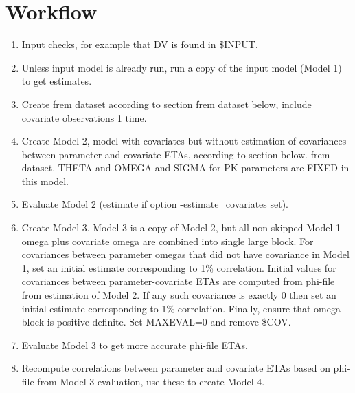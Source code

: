 \section{Workflow}
\begin{enumerate}
\item Input checks, for example that DV is found in \$INPUT.
\item Unless input model is already run,
run a copy of the input model (Model 1) to get estimates.
\item Create frem dataset according to section frem dataset below, include covariate observations 1 time.
\item Create Model 2, model with covariates but without
estimation of covariances between parameter and covariate ETAs,
according to section below. frem dataset.
THETA and OMEGA and SIGMA for PK parameters are FIXED in this model.
\item Evaluate Model 2 (estimate if option -estimate\_covariates set).
\item Create Model 3.
Model 3 is a copy of Model 2, but all non-skipped Model 1 omega plus covariate omega are combined
into single large block. For covariances between parameter omegas that did
not have covariance in Model 1, set
an initial estimate corresponding to 1\% correlation.
Initial values for covariances between parameter-covariate ETAs are computed from
phi-file from estimation of Model 2. If any such covariance is exactly 0 then set
an initial estimate corresponding to 1\% correlation.
Finally, ensure that omega block is positive definite.
Set MAXEVAL=0 and remove \$COV.
\item Evaluate Model 3 to get more accurate phi-file ETAs.
\item Recompute correlations
between parameter and covariate ETAs based on phi-file from Model 3 evaluation,
use these to create Model 4.


\end{enumerate}
